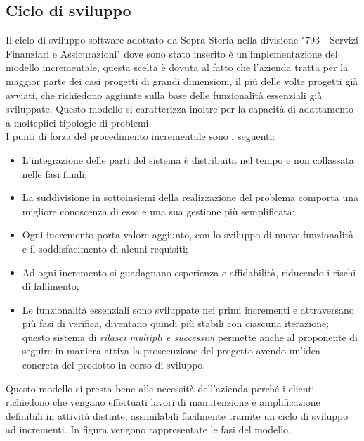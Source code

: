 	\subsection{Ciclo di sviluppo}
	
	Il ciclo di sviluppo software adottato da Sopra Steria nella divisione "793 - Servizi Finanziari e Assicurazioni" dove sono stato inserito è un'implementazione del modello incrementale, questa scelta è dovuta al fatto che l'azienda tratta per la maggior parte dei casi progetti di grandi dimensioni, il più delle volte progetti già avviati, che richiedono aggiunte sulla base delle funzionalità essenziali già sviluppate. Questo modello si caratterizza inoltre per la capacità di adattamento a molteplici tipologie di problemi.\\
	
	I punti di forza del procedimento incrementale sono i seguenti:
	\begin{itemize}
		\item L'integrazione delle parti del sistema è distribuita nel tempo e non collassata nelle fasi finali;
		\item La suddivisione in sottoinsiemi della realizzazione del problema comporta una migliore conoscenza di esso e una sua gestione più semplificata;
		\item Ogni incremento porta valore aggiunto, con lo sviluppo di nuove funzionalità e il soddisfacimento di alcuni requisiti;
		\item Ad ogni incremento si guadagnano esperienza e affidabilità, riducendo i rischi di fallimento;
		\item Le funzionalità essenziali sono sviluppate nei primi incrementi e attraversano più fasi di verifica, diventano quindi più stabili con ciascuna iterazione; questo sistema di \textit{rilasci multipli e successivi} permette anche al proponente di seguire in maniera attiva la prosecuzione del progetto avendo un'idea concreta del prodotto in corso di sviluppo.
	\end{itemize}
	
	Questo modello si presta bene alle necessità dell'azienda perché i clienti richiedono che vengano effettuati lavori di manutenzione e amplificazione definibili in attività distinte, assimilabili facilmente tramite un ciclo di sviluppo ad incrementi. In figura vengono rappresentate le fasi del modello.\\
	
